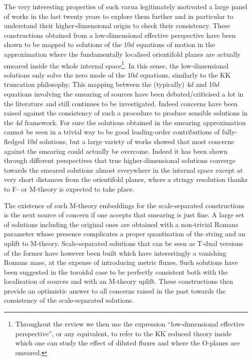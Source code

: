 \documentclass[11pt, a4paper]{article}
\begin{document}
The very interesting properties of such vacua legitimately motivated a large panel of works in the last twenty years to explore them further and in particular to understand their higher-dimensional origin to check their consistency. These constructions obtained from a low-dimensional effective perspective have been shown to be mapped to solutions of the 10$d$ equations of motion in the approximation where the fundamentally localised orientifold planes are actually smeared \cite{Acharya:2006ne} inside the whole internal space\footnote{Throughout the review we then use the expression ``low-dimensional effective perspective'', or any equivalent, to refer to the KK reduced theory inside which one can study the effect of diluted fluxes and where the O-planes are smeared.}. In this sense, the low-dimensional solutions only solve the zero mode of the 10$d$ equations, similarly to the KK truncation philosophy. This mapping between the (typically) 4$d$ and 10$d$ equations involving the smearing of sources have been debated/criticised a lot in the literature and still continues to be investigated. Indeed concerns have been raised \cite{Banks:2006hg,Douglas:2010rt,McOrist:2012yc} against the consistency of such a procedure to produce sensible solutions in the 4$d$ framework. For sure the solutions obtained in the smearing approximation cannot be seen in a trivial way to be good leading-order contributions of fully-fledged 10$d$ solutions, but a large variety of works showed that most concerns against the smearing could actually be overcome. Indeed it has been shown through different perspectives \cite{Cribiori:2021djm,Blaback:2010sj,Baines:2020dmu,Junghans:2020acz,Andriot:2023fss,Marchesano:2020qvg,Marchesano:2021ycx,Marchesano:2022rpr,Emelin:2021gzx} that true higher-dimensional solutions converge towards the smeared solutions almost everywhere in the internal space except at very short distances from the orientifold planes, where a stringy resolution thanks to F- or M-theory is expected to take place.

The existence of such M-theory embeddings for the scale-separated constructions is the next source of concern if one accepts that smearing is just fine. A large set of solutions including the original ones are obtained with a non-trivial Romans parameter whose presence complicates a proper quantisation of the string and an uplift to M-theory. Scale-separated solutions that can be seen as T-dual versions of the former have however been built \cite{Cribiori:2021djm,Carrasco:2023hta} which have interestingly a vanishing Romans mass, at the expense of introducing metric fluxes. Such solutions have been suggested in the toroidal case  \cite{Cribiori:2021djm} to be perfectly consistent both with the localisation of sources and with an M-theory uplift. These constructions then provide an optimistic answer to all concerns raised in the past towards the consistency of the scale-separated solutions.
\end{document}
